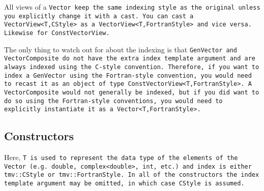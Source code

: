 All views of a \tt{Vector} keep the same indexing style as the original unless you
explicitly change it with a cast.  You can cast a \tt{VectorView<T,CStyle>} as
a \tt{VectorView<T,FortranStyle>} and vice versa.  Likewise for
\tt{ConstVectorView}.  

The only thing to watch out for about the indexing is that \tt{GenVector}
and \tt{VectorComposite} do not have the extra \tt{index} 
template argument and are always
indexed using the C-style convention.  Therefore, 
if you want to index a \tt{GenVector}
using the Fortran-style convention, you would need to recast it
as an object of type
\tt{ConstVectorView<T,FortranStyle>}.  A \tt{VectorComposite} would 
not generally be indexed, but if you did want to do so using the 
Fortran-style conventions, you would need to explicitly instantiate it
as a \tt{Vector<T,FortranStyle>}.

\subsection{Constructors}
\label{Vector_Constructors}

Here, \tt{T} is used to represent the data type of the elements of the \tt{Vector}
(e.g. \tt{double}, \tt{complex<double>}, \tt{int}, etc.) and \tt{index} is either
\tt{tmv::CStyle} or \tt{tmv::FortranStyle}.  In all of the constructors the
\tt{index} template argument may be omitted, in which case \tt{CStyle} is assumed.

